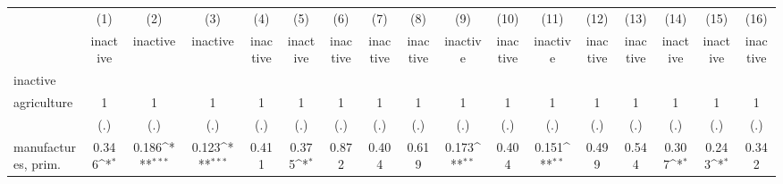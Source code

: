 {
\def\sym#1{\ifmmode^{#1}\else\(^{#1}\)\fi}
\begin{tabular}{l*{16}{c}}
\hline\hline
                    &\multicolumn{1}{c}{(1)}&\multicolumn{1}{c}{(2)}&\multicolumn{1}{c}{(3)}&\multicolumn{1}{c}{(4)}&\multicolumn{1}{c}{(5)}&\multicolumn{1}{c}{(6)}&\multicolumn{1}{c}{(7)}&\multicolumn{1}{c}{(8)}&\multicolumn{1}{c}{(9)}&\multicolumn{1}{c}{(10)}&\multicolumn{1}{c}{(11)}&\multicolumn{1}{c}{(12)}&\multicolumn{1}{c}{(13)}&\multicolumn{1}{c}{(14)}&\multicolumn{1}{c}{(15)}&\multicolumn{1}{c}{(16)}\\
                    &\multicolumn{1}{c}{inactive}&\multicolumn{1}{c}{inactive}&\multicolumn{1}{c}{inactive}&\multicolumn{1}{c}{inactive}&\multicolumn{1}{c}{inactive}&\multicolumn{1}{c}{inactive}&\multicolumn{1}{c}{inactive}&\multicolumn{1}{c}{inactive}&\multicolumn{1}{c}{inactive}&\multicolumn{1}{c}{inactive}&\multicolumn{1}{c}{inactive}&\multicolumn{1}{c}{inactive}&\multicolumn{1}{c}{inactive}&\multicolumn{1}{c}{inactive}&\multicolumn{1}{c}{inactive}&\multicolumn{1}{c}{inactive}\\
\hline
inactive            &                     &                     &                     &                     &                     &                     &                     &                     &                     &                     &                     &                     &                     &                     &                     &                     \\
agriculture         &           1         &           1         &           1         &           1         &           1         &           1         &           1         &           1         &           1         &           1         &           1         &           1         &           1         &           1         &           1         &           1         \\
                    &         (.)         &         (.)         &         (.)         &         (.)         &         (.)         &         (.)         &         (.)         &         (.)         &         (.)         &         (.)         &         (.)         &         (.)         &         (.)         &         (.)         &         (.)         &         (.)         \\
[1em]
manufactures, prim. &       0.346\sym{*}  &       0.186\sym{***}&       0.123\sym{***}&       0.411         &       0.375\sym{*}  &       0.872         &       0.404         &       0.619         &       0.173\sym{**} &       0.404         &       0.151\sym{**} &       0.499         &       0.544         &       0.307\sym{*}  &       0.243\sym{*}  &       0.342         \\

\end{tabular}}
